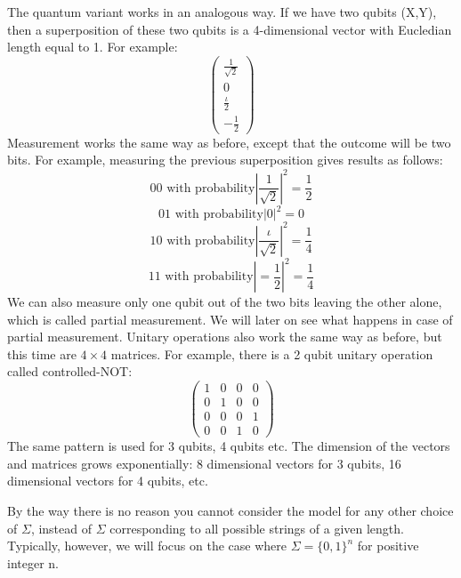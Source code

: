 \documentclass[12pt, oneside]{book}
\theoremstyle{definition}
\theoremstyle{definition}
\theoremstyle{remark}
\begin{document}
The quantum variant works in an analogous way. If we have two qubits (X,Y), then a superposition of these two qubits is a 4-dimensional vector with Eucledian length equal to 1. For example:
\[
\begin{pmatrix} \frac{1}{\sqrt{2}} \\ 0 \\ \frac{\iota}{2} \\ -\frac{1}{2} \end{pmatrix}
\]
Measurement works the same way as before, except that the outcome will be two bits. For example, measuring the previous superposition gives results as follows:
\[
\text{00 with probability} |\frac{1}{\sqrt{2}}|^2=\frac{1}{2}
\]
\[
\text{01 with probability} |0|^2=0
\]
\[
\text{10 with probability} |\frac{\iota}{\sqrt{2}}|^2=\frac{1}{4}
\]
\[
\text{11 with probability} |=\frac{1}{2}|^2=\frac{1}{4}
\]
We can also measure only one qubit out of the two bits leaving the other alone, which is called partial measurement. We will later on see what happens in case of partial measurement. Unitary operations also work the same way as before, but this time are $4 \times 4$ matrices. For example, there is a 2 qubit unitary operation called controlled-NOT:
\[
\begin{pmatrix} 1 & 0 & 0 & 0 \\ 0 & 1 & 0 & 0 \\ 0 & 0 & 0 & 1\\ 0 & 0 & 1 & 0 \end{pmatrix}
\]
The same pattern is used for 3 qubits, 4 qubits etc. The dimension of the vectors and matrices grows exponentially: 8 dimensional vectors for 3 qubits, 16 dimensional vectors for 4 qubits, etc.

By the way there is no reason you cannot consider the model for any other choice of $\Sigma$, instead of $\Sigma$ corresponding to all possible strings of a given length. Typically, however, we will focus on the case where $\Sigma=\{0,1\}^n$ for positive integer n.
\end{document}
